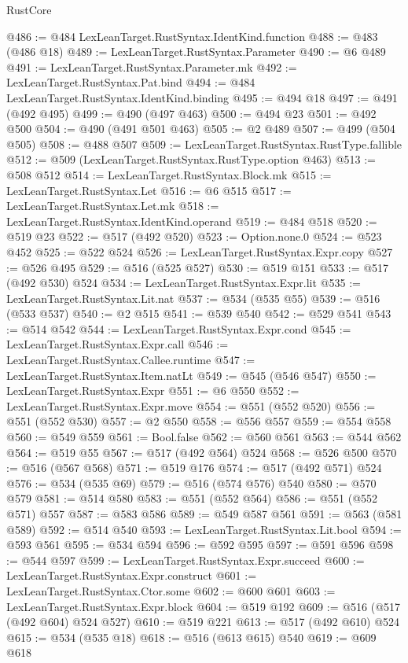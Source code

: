 \begin{lexlean}{RustCore}
\begin{coremodule}
@486 := @484 LexLeanTarget.RustSyntax.IdentKind.function
@488 := @483 (@486 @18)
@489 := LexLeanTarget.RustSyntax.Parameter
@490 := @6 @489
@491 := LexLeanTarget.RustSyntax.Parameter.mk
@492 := LexLeanTarget.RustSyntax.Pat.bind
@494 := @484 LexLeanTarget.RustSyntax.IdentKind.binding
@495 := @494 @18
@497 := @491 (@492 @495)
@499 := @490 (@497 @463)
@500 := @494 @23
@501 := @492 @500
@504 := @490 (@491 @501 @463)
@505 := @2 @489
@507 := @499 (@504 @505)
@508 := @488 @507
@509 := LexLeanTarget.RustSyntax.RustType.fallible
@512 := @509 (LexLeanTarget.RustSyntax.RustType.option @463)
@513 := @508 @512
@514 := LexLeanTarget.RustSyntax.Block.mk
@515 := LexLeanTarget.RustSyntax.Let
@516 := @6 @515
@517 := LexLeanTarget.RustSyntax.Let.mk
@518 := LexLeanTarget.RustSyntax.IdentKind.operand
@519 := @484 @518
@520 := @519 @23
@522 := @517 (@492 @520)
@523 := Option.none.{0}
@524 := @523 @452
@525 := @522 @524
@526 := LexLeanTarget.RustSyntax.Expr.copy
@527 := @526 @495
@529 := @516 (@525 @527)
@530 := @519 @151
@533 := @517 (@492 @530) @524
@534 := LexLeanTarget.RustSyntax.Expr.lit
@535 := LexLeanTarget.RustSyntax.Lit.nat
@537 := @534 (@535 @55)
@539 := @516 (@533 @537)
@540 := @2 @515
@541 := @539 @540
@542 := @529 @541
@543 := @514 @542
@544 := LexLeanTarget.RustSyntax.Expr.cond
@545 := LexLeanTarget.RustSyntax.Expr.call
@546 := LexLeanTarget.RustSyntax.Callee.runtime
@547 := LexLeanTarget.RustSyntax.Item.natLt
@549 := @545 (@546 @547)
@550 := LexLeanTarget.RustSyntax.Expr
@551 := @6 @550
@552 := LexLeanTarget.RustSyntax.Expr.move
@554 := @551 (@552 @520)
@556 := @551 (@552 @530)
@557 := @2 @550
@558 := @556 @557
@559 := @554 @558
@560 := @549 @559
@561 := Bool.false
@562 := @560 @561
@563 := @544 @562
@564 := @519 @55
@567 := @517 (@492 @564) @524
@568 := @526 @500
@570 := @516 (@567 @568)
@571 := @519 @176
@574 := @517 (@492 @571) @524
@576 := @534 (@535 @69)
@579 := @516 (@574 @576) @540
@580 := @570 @579
@581 := @514 @580
@583 := @551 (@552 @564)
@586 := @551 (@552 @571) @557
@587 := @583 @586
@589 := @549 @587 @561
@591 := @563 (@581 @589)
@592 := @514 @540
@593 := LexLeanTarget.RustSyntax.Lit.bool
@594 := @593 @561
@595 := @534 @594
@596 := @592 @595
@597 := @591 @596
@598 := @544 @597
@599 := LexLeanTarget.RustSyntax.Expr.succeed
@600 := LexLeanTarget.RustSyntax.Expr.construct
@601 := LexLeanTarget.RustSyntax.Ctor.some
@602 := @600 @601
@603 := LexLeanTarget.RustSyntax.Expr.block
@604 := @519 @192
@609 := @516 (@517 (@492 @604) @524 @527)
@610 := @519 @221
@613 := @517 (@492 @610) @524
@615 := @534 (@535 @18)
@618 := @516 (@613 @615) @540
@619 := @609 @618

\end{coremodule}
\end{lexlean}
